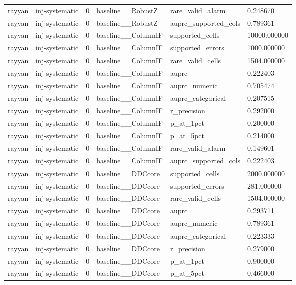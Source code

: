 \begin{tabular}{llllll}
rayyan & inj-systematic & 0 & baseline\_\_RobustZ & rare\_valid\_alarm & 0.248670 \\
rayyan & inj-systematic & 0 & baseline\_\_RobustZ & auprc\_supported\_cols & 0.789361 \\
rayyan & inj-systematic & 0 & baseline\_\_ColumnIF & supported\_cells & 10000.000000 \\
rayyan & inj-systematic & 0 & baseline\_\_ColumnIF & supported\_errors & 1000.000000 \\
rayyan & inj-systematic & 0 & baseline\_\_ColumnIF & rare\_valid\_cells & 1504.000000 \\
rayyan & inj-systematic & 0 & baseline\_\_ColumnIF & auprc & 0.222403 \\
rayyan & inj-systematic & 0 & baseline\_\_ColumnIF & auprc\_numeric & 0.705474 \\
rayyan & inj-systematic & 0 & baseline\_\_ColumnIF & auprc\_categorical & 0.207515 \\
rayyan & inj-systematic & 0 & baseline\_\_ColumnIF & r\_precision & 0.292000 \\
rayyan & inj-systematic & 0 & baseline\_\_ColumnIF & p\_at\_1pct & 0.200000 \\
rayyan & inj-systematic & 0 & baseline\_\_ColumnIF & p\_at\_5pct & 0.214000 \\
rayyan & inj-systematic & 0 & baseline\_\_ColumnIF & rare\_valid\_alarm & 0.149601 \\
rayyan & inj-systematic & 0 & baseline\_\_ColumnIF & auprc\_supported\_cols & 0.222403 \\
rayyan & inj-systematic & 0 & baseline\_\_DDCcore & supported\_cells & 2000.000000 \\
rayyan & inj-systematic & 0 & baseline\_\_DDCcore & supported\_errors & 281.000000 \\
rayyan & inj-systematic & 0 & baseline\_\_DDCcore & rare\_valid\_cells & 1504.000000 \\
rayyan & inj-systematic & 0 & baseline\_\_DDCcore & auprc & 0.293711 \\
rayyan & inj-systematic & 0 & baseline\_\_DDCcore & auprc\_numeric & 0.789361 \\
rayyan & inj-systematic & 0 & baseline\_\_DDCcore & auprc\_categorical & 0.223333 \\
rayyan & inj-systematic & 0 & baseline\_\_DDCcore & r\_precision & 0.279000 \\
rayyan & inj-systematic & 0 & baseline\_\_DDCcore & p\_at\_1pct & 0.900000 \\
rayyan & inj-systematic & 0 & baseline\_\_DDCcore & p\_at\_5pct & 0.466000 \\

\end{tabular}
